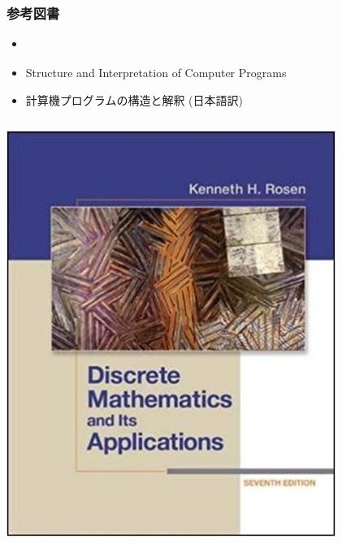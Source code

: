 \begin{frame}[shrink]
\frametitle{参考図書}
  \begin{itemize}
\item \href{https://www.mheducation.com/highered/product/discrete-mathematics-applications-rosen/M0073383090.html}{}
\item Structure and Interpretation of Computer Programs \href{http://web.mit.edu/alexmv/6.037/sicp.pdf}{} 
\item 計算機プログラムの構造と解釈 (日本語訳)\\ \href{http://sicp.iijlab.net/fulltext/xcont.html}{} 
  \end{itemize}
  \begin{columns}[c]
    \begin{column}{0.5\textwidth}
\centering
\includegraphics[scale=.25]{./Figure/Discrete_Mathematics_And_its_Applications.jpg}
    \end{column}
    \begin{column}{0.45\textwidth}
\centering

\end{column}
\end{columns}
\end{frame}
